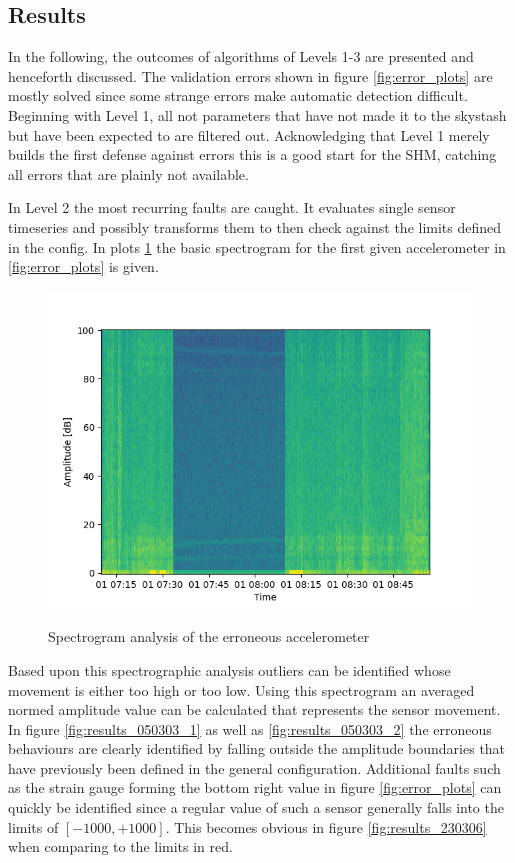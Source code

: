 \subsection{Results}


In the following, the outcomes of algorithms of Levels 1-3 are presented and henceforth discussed.
The validation errors shown in figure \ref{fig:error_plots} are mostly solved since some strange errors make automatic detection difficult.
Beginning with Level 1, all not parameters that have not made it to the skystash but have been expected to are filtered out. Acknowledging that Level 1 merely builds the first defense against errors this is a good start for the SHM, catching all errors that are plainly not available.

In Level 2 the most recurring faults are caught. It evaluates single sensor timeseries and possibly transforms them to then check against the limits defined in the config. In plots \ref{fig:results_050303_spectrogram} the basic spectrogram for the first given accelerometer in \ref{fig:error_plots} is given.
\begin{figure}
    \centering
    \includegraphics[width=.7\textwidth]{03_figures/python_functions/images/FUS_050303_spectro.png}
    \label{fig:results_050303_spectrogram}
    \caption{Spectrogram analysis of the erroneous accelerometer}
\end{figure}
Based upon this spectrographic analysis outliers can be identified whose movement is either too high or too low. Using this spectrogram an averaged normed amplitude value can be calculated that represents the sensor movement. In figure \ref{fig:results_050303_1} as well as \ref{fig:results_050303_2} the erroneous behaviours are clearly identified by falling outside the amplitude boundaries that have previously been defined in the general configuration.
Additional faults such as the strain gauge forming the bottom right value in figure \ref{fig:error_plots} can quickly be identified since a regular value of such a sensor generally falls into the limits of $[-1000, +1000]$. This becomes obvious in figure \ref{fig:results_230306} when comparing to the limits in red.
